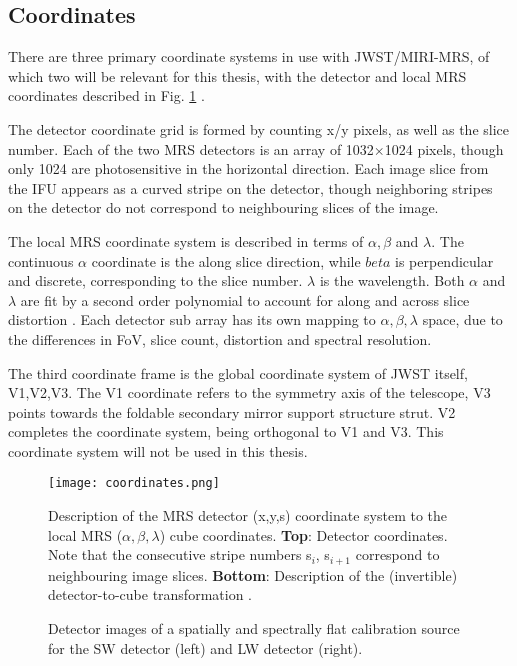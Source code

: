 \subsection{Coordinates}
There are three primary coordinate systems in use with JWST/MIRI-MRS, of which two will be relevant for this thesis, with the detector and local MRS coordinates described in Fig. \ref{fig:mrscoords} \autocite{Argyriou2020}.

The detector coordinate grid is formed by counting x/y pixels, as well as the slice number.
Each of the two MRS detectors is an array of 1032$\times$1024 pixels, though only 1024 are photosensitive in the horizontal direction.
Each image slice from the IFU appears as a curved stripe on the detector, though neighboring stripes on the detector do not correspond to neighbouring slices of the image. 

The local MRS coordinate system is described in terms of $\alpha,\beta$ and $\lambda$. The continuous $\alpha$ coordinate is the along slice direction, while $beta$ is perpendicular and discrete, corresponding to the slice number. $\lambda$ is the wavelength. Both $\alpha$ and $\lambda$ are fit by a second order polynomial to account for along and across slice distortion \autocite{MIRI6}. Each detector sub array has its own mapping to $\alpha,\beta,\lambda$ space, due to the differences in FoV, slice count, distortion and spectral resolution.

The third coordinate frame is the global coordinate system of JWST itself, V1,V2,V3. The V1 coordinate refers to the symmetry axis of the telescope, V3 points towards the foldable secondary mirror support structure strut. V2 completes the coordinate system, being orthogonal to V1 and V3. This coordinate system will not be used in this thesis.

\begin{figure}[t]
	\texttt{[image: coordinates.png]}
	\caption{Description of the MRS detector (x,y,s) coordinate system to the local MRS ($\alpha,\beta,\lambda$) cube coordinates. \textbf{Top}: Detector coordinates. Note that the consecutive stripe numbers s$_{i}$, s$_{i+1}$ correspond to neighbouring image slices. \textbf{Bottom}: Description of the (invertible) detector-to-cube transformation \autocite{Argyriou2020}.}
	\label{fig:mrscoords}	
\end{figure}

\begin{figure}[t]
	\caption{Detector images of a spatially and spectrally flat calibration source for the SW detector (left) and LW detector (right).}
	\label{fig:flatfield}
\end{figure}
